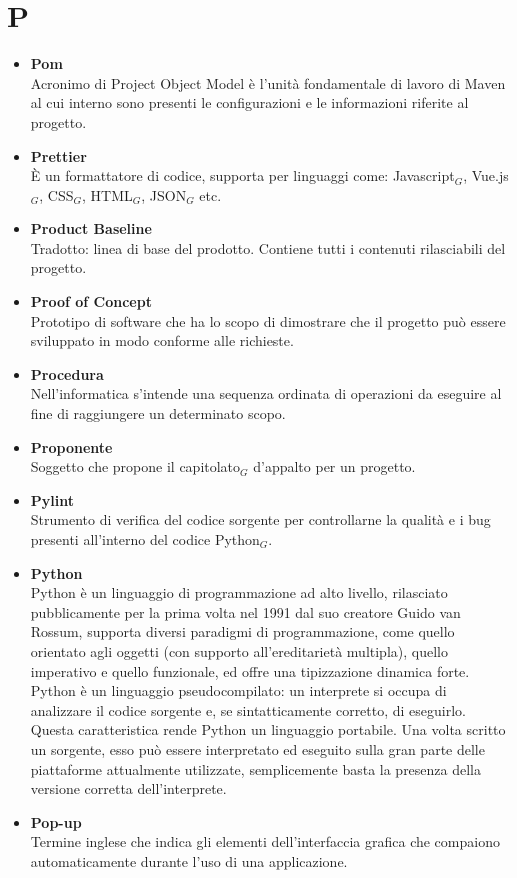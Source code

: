 \chapter{P} \label{P}
	\begin{itemize}
		\item \textbf{Pom}\\
		Acronimo di Project Object Model è l'unità fondamentale di lavoro di Maven al cui interno sono presenti le configurazioni e le informazioni riferite al progetto.
		
		\item \textbf{Prettier} \\
		È un formattatore di codice, supporta per linguaggi come: Javascript$_G$, Vue.js$_G$, CSS$_G$, HTML$_G$, JSON$_G$ etc.

		\item \textbf{Product Baseline}\\
		Tradotto: linea di base del prodotto.
		Contiene tutti i contenuti rilasciabili del progetto.

		\item \textbf{Proof of Concept}\\
		Prototipo di software che ha lo scopo di dimostrare che il progetto può essere sviluppato in modo conforme alle richieste.

		\item \textbf{Procedura}\\
		Nell'informatica s'intende una sequenza ordinata di operazioni da eseguire al fine di raggiungere un determinato scopo.

		\item \textbf{Proponente}\\
		Soggetto che propone il capitolato$_G$ d'appalto per un progetto.

		\item \textbf{Pylint} \\
		Strumento di verifica del codice sorgente per controllarne la qualità e i bug presenti all'interno del codice Python$_G$.

		\item \textbf{Python}\\
		Python è un linguaggio di programmazione ad alto livello, rilasciato pubblicamente per la prima volta nel 1991 dal suo creatore Guido van Rossum, supporta diversi paradigmi di programmazione, come quello orientato agli oggetti (con supporto all'ereditarietà multipla), quello imperativo e quello funzionale, ed offre una tipizzazione dinamica forte.
		Python è un linguaggio pseudocompilato: un interprete si occupa di analizzare il codice sorgente e, se sintatticamente corretto, di eseguirlo. Questa caratteristica rende Python un linguaggio portabile. Una volta scritto un sorgente, esso può essere interpretato ed eseguito sulla gran parte delle piattaforme attualmente utilizzate, semplicemente basta la presenza della versione corretta dell’interprete.

		\item \textbf{Pop-up}\\
		Termine inglese che indica gli elementi dell'interfaccia grafica che compaiono automaticamente durante l'uso di una applicazione.
	\end{itemize}
